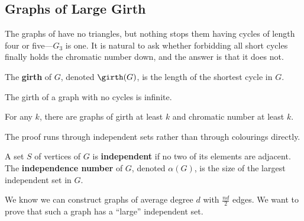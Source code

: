 \subsection{Graphs of Large Girth}

The graphs of  have no triangles, but nothing stops them having cycles of length four or five---$G_3$ is one. It is natural to ask whether forbidding all short cycles finally holds the chromatic number down, and the answer is that it does not.

\begin{boxdefinition}[Girth]
    The \textbf{girth} of $G$, denoted $\girth(G)$, is the length of the shortest cycle in $G$.
\end{boxdefinition}

The girth of a graph with no cycles is infinite.

\begin{boxtheorem}[\Erdos] \label{Ch2:Thm:Erdos_Girth}
    For any $k$, there are graphs of girth at least $k$ and chromatic number at least $k$.
\end{boxtheorem}

The proof runs through independent sets rather than through colourings directly.

\begin{boxdefinition}
    A set $S$ of vertices of $G$ is \textbf{independent} if no two of its elements are adjacent. The \textbf{independence number} of $G$, denoted $\alpha(G)$, is the size of the largest independent set in $G$.
\end{boxdefinition}

We know we can construct graphs of average degree $d$ with $\frac{nd}{2}$ edges. We want to prove that such a graph has a ``large'' independent set.

